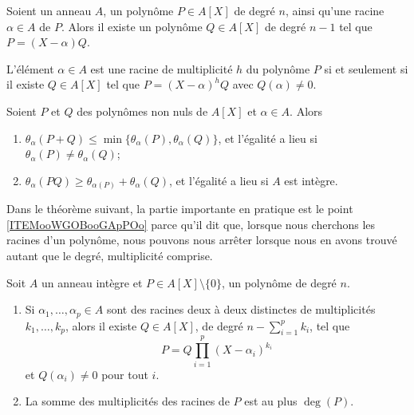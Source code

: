 \begin{proposition}     \label{PROPooQCZSooVokxXQ}
	Soient un anneau \( A\), un polynôme \( P\in A[X]\) de degré \( n\), ainsi qu'une racine \( \alpha\in A\) de \( P\). Alors il existe un polynôme \( Q\in A[X]\) de degré \( n-1\) tel que \( P=(X-\alpha)Q\).
\end{proposition}


\begin{proposition} \label{PropahQQpA}
	L'élément \( \alpha\in A\) est une racine de multiplicité \( h\) du
	polynôme \( P\) si et seulement si il existe \( Q\in A[X]\) tel que
	\( P=(X-\alpha)^hQ\) avec \( Q(\alpha)\neq 0\).
\end{proposition}

\begin{lemma}       \label{LemIeLhpc}
	Soient \( P\) et \( Q\) des polynômes non nuls de \( A[X]\) et \( \alpha\in A\). Alors
	\begin{enumerate}
		\item
		      \( \theta_{\alpha}(P+Q)\leq\min\{
		      \theta_{\alpha}(P),\theta_{\alpha}(Q) \}\), et l'égalité a
		      lieu si \( \theta_{\alpha}(P)\neq \theta_{\alpha}(Q)\);
		\item     \label{ItemIeLhpciv}
		      \( \theta_{\alpha}(PQ)\geq
		      \theta_{\alpha(P)}+\theta_{\alpha}(Q)\), et l'égalité a
		      lieu si \( A \) est intègre.
	\end{enumerate}
\end{lemma}

Dans le théorème suivant, la partie importante en pratique est le point \ref{ITEMooWGOBooGApPOo} parce qu'il dit que, lorsque nous cherchons les racines d'un polynôme, nous pouvons nous arrêter lorsque nous en avons trouvé autant que le degré, multiplicité comprise.
\begin{theorem} \label{ThoSVZooMpNANi}
	Soit \( A\) un anneau intègre
	et \( P\in A[X]\setminus\{ 0 \}\), un polynôme de degré \( n\).

	\begin{enumerate}
		\item
		      Si \( \alpha_1,\ldots, \alpha_p\in A\) sont des racines deux à deux
		      distinctes de multiplicités \( k_1,\ldots, k_p\), alors il existe \(
		      Q\in A[X]\), de degré \( n-\sum_{i=1}^pk_i\), tel que
		      \begin{equation}
			      P=Q\prod_{i=1}^p(X-\alpha_i)^{k_i}
		      \end{equation}
		      et \( Q(\alpha_i)\neq 0\) pour tout \( i\).
		\item     \label{ITEMooWGOBooGApPOo}
		      La somme des multiplicités des racines de \( P\) est au plus \( \deg(P)\).
	\end{enumerate}
\end{theorem}


